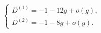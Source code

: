 \begin{equation}\label{parquetfalse12}
\left\{
    \begin{array}{l}
    D^{(1)}=-1-12g+o(g),
    \\
    D^{(2)}=-1-8g+o(g).
    \end{array}\right.
\end{equation}

